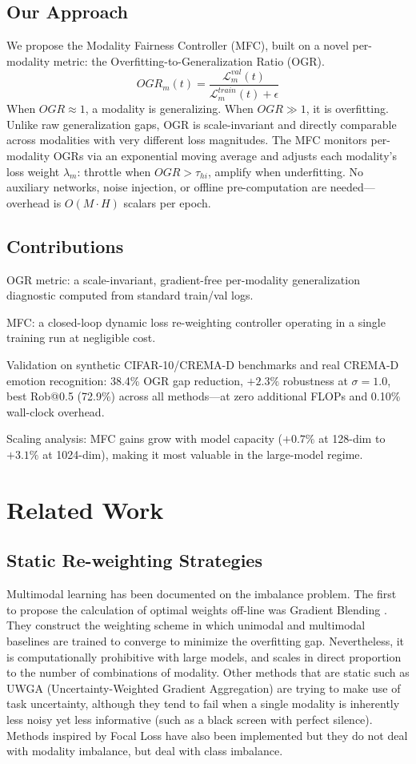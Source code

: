 \documentclass[10pt, twocolumn, letterpaper]{article}
\begin{document}
\subsection*{Our Approach}
We propose the Modality Fairness Controller (MFC), built on a novel per-modality metric: the Overfitting-to-Generalization Ratio (OGR).
\[
OGR_m(t) = \frac{\mathcal{L}^{val}_m(t)}{\mathcal{L}^{train}_m(t) + \epsilon}
\]
When $OGR \approx 1$, a modality is generalizing. When $OGR \gg 1$, it is overfitting. Unlike raw generalization gaps, OGR is scale-invariant and directly comparable across modalities with very different loss magnitudes. The MFC monitors per-modality OGRs via an exponential moving average and adjusts each modality's loss weight $\lambda_m$: throttle when $OGR > \tau_{hi}$, amplify when underfitting. No auxiliary networks, noise injection, or offline pre-computation are needed---overhead is $O(M \cdot H)$ scalars per epoch.

\subsection*{Contributions}
OGR metric: a scale-invariant, gradient-free per-modality generalization diagnostic computed from standard train/val logs.

MFC: a closed-loop dynamic loss re-weighting controller operating in a single training run at negligible cost.

Validation on synthetic CIFAR-10/CREMA-D benchmarks and real CREMA-D emotion recognition: 38.4\% OGR gap reduction, $+2.3\%$ robustness at $\sigma{=}1.0$, best Rob@0.5 (72.9\%) across all methods---at zero additional FLOPs and 0.10\% wall-clock overhead.

Scaling analysis: MFC gains grow with model capacity ($+0.7\%$ at 128-dim to $+3.1\%$ at 1024-dim), making it most valuable in the large-model regime.

\section{Related Work}

\subsection{Static Re-weighting Strategies}
Multimodal learning has been documented on the imbalance problem. The first to propose the calculation of optimal weights off-line was Gradient Blending \cite{wang2020makes}. They construct the weighting scheme in which unimodal and multimodal baselines are trained to converge to minimize the overfitting gap. Nevertheless, it is computationally prohibitive with large models, and scales in direct proportion to the number of combinations of modality. Other methods that are static such as UWGA (Uncertainty-Weighted Gradient Aggregation) \cite{kendall2018multi} are trying to make use of task uncertainty, although they tend to fail when a single modality is inherently less noisy yet less informative (such as a black screen with perfect silence). Methods inspired by Focal Loss \cite{lin2017focal} have also been implemented but they do not deal with modality imbalance, but deal with class imbalance.
\end{document}
